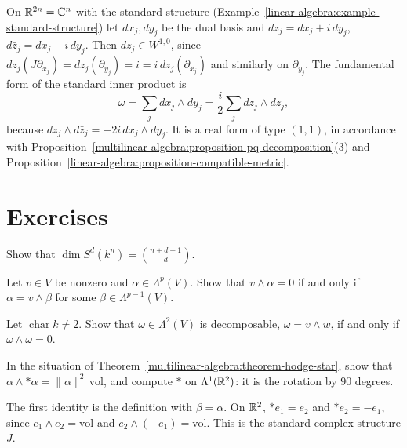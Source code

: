 \begin{example}\label{multilinear-algebra:example-standard-pq}
On $\mathbb{R}^{2n} = \mathbb{C}^n$ with the standard structure (Example~\ref{linear-algebra:example-standard-structure}) let
$dx_j, dy_j$ be the dual basis and $dz_j = dx_j + i\,dy_j$, $d\bar z_j = dx_j - i\,dy_j$. Then $dz_j \in W^{1,0}$, since
$dz_j(J\partial_{x_j}) = dz_j(\partial_{y_j}) = i = i\,dz_j(\partial_{x_j})$ and similarly on $\partial_{y_j}$. The fundamental form
of the standard inner product is
\[
\omega = \sum_j dx_j \wedge dy_j = \frac{i}{2}\sum_j dz_j \wedge d\bar z_j,
\]
because $dz_j \wedge d\bar z_j = -2i\,dx_j \wedge dy_j$. It is a real form of type $(1,1)$, in accordance with
Proposition~\ref{multilinear-algebra:proposition-pq-decomposition}(3) and
Proposition~\ref{linear-algebra:proposition-compatible-metric}.
\end{example}

\section{Exercises}\label{multilinear-algebra:section-exercises}

\begin{exercise}\label{multilinear-algebra:exercise-symmetric-dimension}
Show that $\dim S^d(k^n) = \binom{n + d - 1}{d}$.
\end{exercise}

\begin{exercise}\label{multilinear-algebra:exercise-divisibility}
Let $v \in V$ be nonzero and $\alpha \in \Lambda^p(V)$. Show that $v \wedge \alpha = 0$ if and only if $\alpha = v \wedge \beta$ for some
$\beta \in \Lambda^{p-1}(V)$.
\end{exercise}

\begin{exercise}\label{multilinear-algebra:exercise-plucker}
Let $\operatorname{char} k \neq 2$. Show that $\omega \in \Lambda^2(V)$ is decomposable, $\omega = v \wedge w$, if and only if
$\omega \wedge \omega = 0$.
\end{exercise}

\begin{exercise}\label{multilinear-algebra:exercise-star-norm}
In the situation of Theorem~\ref{multilinear-algebra:theorem-hodge-star}, show that
$\alpha \wedge *\alpha = \|\alpha\|^2\,\mathrm{vol}$, and compute $*$ on $\Lambda^1(\mathbb{R}^2)$: it is the rotation by $90$ degrees.
\end{exercise}

\begin{solution}
The first identity is the definition with $\beta = \alpha$. On $\mathbb{R}^2$, $*e_1 = e_2$ and $*e_2 = -e_1$, since
$e_1 \wedge e_2 = \mathrm{vol}$ and $e_2 \wedge (-e_1) = \mathrm{vol}$. This is the standard complex structure $J$.
\end{solution}

